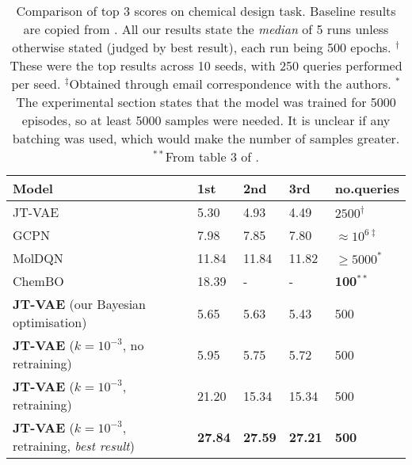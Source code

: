 \begin{table}[h]
  \centering
  \begin{tabular}{lllll}
    \toprule
    \textbf{Model}     & \textbf{1st}     & \textbf{2nd} & \textbf{3rd} & \textbf{no.\@ queries } \\
    \midrule
    JT-VAE \citep{jin_junction_2019} & 5.30  & 4.93 & 4.49 & $2500^\dagger$     \\
    GCPN \citep{you_graph_2018}     & 7.98 & 7.85 & 7.80 & $\approx10^{6\ddagger}$     \\
    MolDQN \citep{zhou_optimization_2019} & 11.84 & 11.84 & 11.82 & $\geq5000^*$  \\
    ChemBO \citep{korovina2020chembo} & 18.39 & - & - & \textbf{100}$^{**}$ \\
    \midrule
    \textbf{JT-VAE} (our Bayesian optimisation) & 5.65 & 5.63 & 5.43 & 500 \\
    \textbf{JT-VAE} ($k=10^{-3}$, no retraining) & 5.95 & 5.75 & 5.72 & 500 \\
    \textbf{JT-VAE} ($k=10^{-3}$, retraining) & 21.20 & 15.34 & 15.34 & 500 \\
    \textbf{JT-VAE} ($k=10^{-3}$, retraining, \emph{best result}) & \textbf{27.84} & \textbf{27.59} & \textbf{27.21} & \textbf{500} \\
    \bottomrule
  \end{tabular}
  \caption[Comparison of top 3 scores on chemical design task.]{
    Comparison of top 3 scores on chemical design task.
  Baseline results are copied from \citep{zhou_optimization_2019}.
  All our results state the \emph{median} of 5 runs unless otherwise stated (judged by best result),
  each run being 500 epochs.
  $^\dagger$These were the top results across 10 seeds, with 250 queries performed per seed.
  $^\ddagger$Obtained through email correspondence with the authors.
  $^*$The experimental section states that the model was trained for 5000 episodes,
  so at least 5000 samples were needed.
  It is unclear if any batching was used, which would make the number of samples greater.
  $^{**}$From table 3 of \citet{korovina2020chembo}.
  }
  \label{tab:chem-results}
\end{table}

